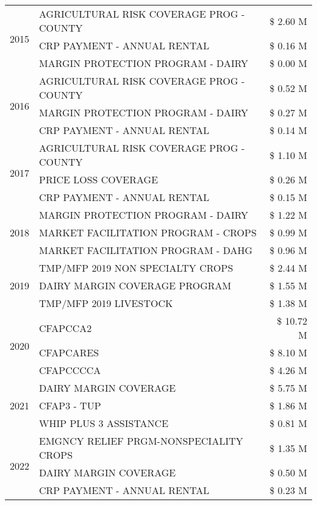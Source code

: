 \begin{tabular}{llr}
\cline{1-3}
\multirow[t]{3}{*}{2015} & AGRICULTURAL RISK COVERAGE PROG - COUNTY & \$ 2.60 M \\
 & CRP PAYMENT - ANNUAL RENTAL & \$ 0.16 M \\
 & MARGIN PROTECTION PROGRAM - DAIRY & \$ 0.00 M \\
\cline{1-3}
\multirow[t]{3}{*}{2016} & AGRICULTURAL RISK COVERAGE PROG - COUNTY & \$ 0.52 M \\
 & MARGIN PROTECTION PROGRAM - DAIRY & \$ 0.27 M \\
 & CRP PAYMENT - ANNUAL RENTAL & \$ 0.14 M \\
\cline{1-3}
\multirow[t]{3}{*}{2017} & AGRICULTURAL RISK COVERAGE PROG - COUNTY & \$ 1.10 M \\
 & PRICE LOSS COVERAGE & \$ 0.26 M \\
 & CRP PAYMENT - ANNUAL RENTAL & \$ 0.15 M \\
\cline{1-3}
\multirow[t]{3}{*}{2018} & MARGIN PROTECTION PROGRAM - DAIRY & \$ 1.22 M \\
 & MARKET FACILITATION PROGRAM - CROPS & \$ 0.99 M \\
 & MARKET FACILITATION PROGRAM - DAHG & \$ 0.96 M \\
\cline{1-3}
\multirow[t]{3}{*}{2019} & TMP/MFP 2019 NON SPECIALTY CROPS & \$ 2.44 M \\
 & DAIRY MARGIN COVERAGE PROGRAM & \$ 1.55 M \\
 & TMP/MFP 2019 LIVESTOCK & \$ 1.38 M \\
\cline{1-3}
\multirow[t]{3}{*}{2020} & CFAPCCA2 & \$ 10.72 M \\
 & CFAPCARES & \$ 8.10 M \\
 & CFAPCCCCA & \$ 4.26 M \\
\cline{1-3}
\multirow[t]{3}{*}{2021} & DAIRY MARGIN COVERAGE & \$ 5.75 M \\
 & CFAP3 - TUP & \$ 1.86 M \\
 & WHIP PLUS 3 ASSISTANCE & \$ 0.81 M \\
\cline{1-3}
\multirow[t]{3}{*}{2022} & EMGNCY RELIEF PRGM-NONSPECIALITY CROPS & \$ 1.35 M \\
 & DAIRY MARGIN COVERAGE & \$ 0.50 M \\
 & CRP PAYMENT - ANNUAL RENTAL & \$ 0.23 M \\
\cline{1-3}
\bottomrule
\end{tabular}
